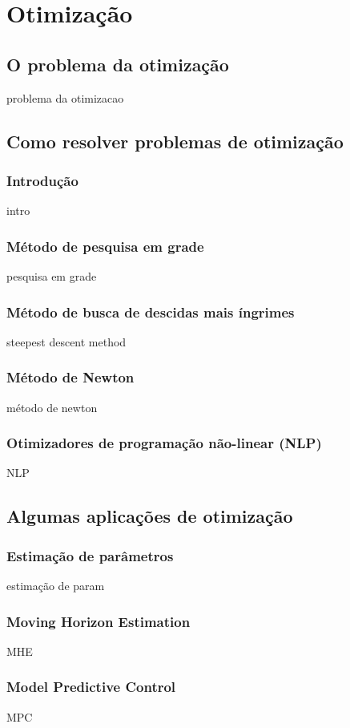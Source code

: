 \chapter{Otimização}
\label{otimizacao}

\section{O problema da otimização}

problema da otimizacao

\section{Como resolver problemas de otimização}

\subsection{Introdução}

intro

\subsection{Método de pesquisa em grade}

pesquisa em grade

\subsection{Método de busca de descidas mais íngrimes}

steepest descent method

\subsection{Método de Newton}

método de newton

\subsection{Otimizadores de programação não-linear (NLP)}

NLP

\section{Algumas aplicações de otimização}

\subsection{Estimação de parâmetros}

estimação de param

\subsection{Moving Horizon Estimation}

MHE

\subsection{Model Predictive Control}

MPC